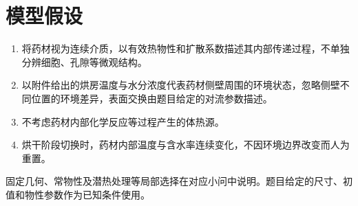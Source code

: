 \section{模型假设}

\begin{enumerate}
  \item 将药材视为连续介质，以有效热物性和扩散系数描述其内部传递过程，不单独分辨细胞、孔隙等微观结构。
  \item 以附件给出的烘房温度与水分浓度代表药材侧壁周围的环境状态，忽略侧壁不同位置的环境差异，表面交换由题目给定的对流参数描述。
  \item 不考虑药材内部化学反应等过程产生的体热源。
  \item 烘干阶段切换时，药材内部温度与含水率连续变化，不因环境边界改变而人为重置。
\end{enumerate}

固定几何、常物性及潜热处理等局部选择在对应小问中说明。题目给定的尺寸、初值和物性参数作为已知条件使用。
